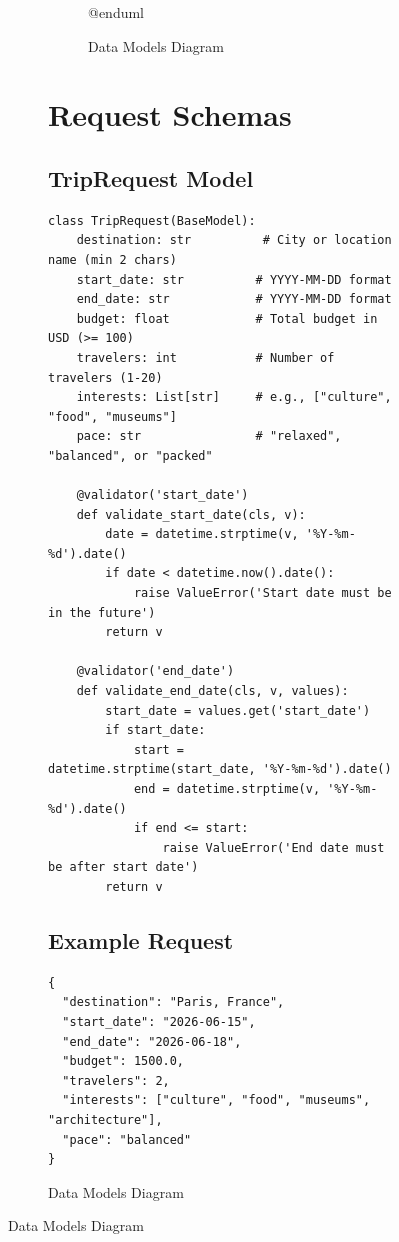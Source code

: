 \documentclass[12pt,a4paper]{report}
\begin{document}
\begin{figure}[H]
\begin{plantuml}
\begin{figure}[H]
\begin{plantuml}
\begin{figure}[H]
\begin{plantuml}
@enduml
    \end{plantuml}
    \caption{Data Models Diagram}
    \label{fig:data-models}
\end{figure}

\section{Request Schemas}

\subsection{TripRequest Model}

\begin{lstlisting}[style=pythonstyle, caption={TripRequest Pydantic Model}]
class TripRequest(BaseModel):
    destination: str          # City or location name (min 2 chars)
    start_date: str          # YYYY-MM-DD format
    end_date: str            # YYYY-MM-DD format
    budget: float            # Total budget in USD (>= 100)
    travelers: int           # Number of travelers (1-20)
    interests: List[str]     # e.g., ["culture", "food", "museums"]
    pace: str                # "relaxed", "balanced", or "packed"
    
    @validator('start_date')
    def validate_start_date(cls, v):
        date = datetime.strptime(v, '%Y-%m-%d').date()
        if date < datetime.now().date():
            raise ValueError('Start date must be in the future')
        return v
    
    @validator('end_date')
    def validate_end_date(cls, v, values):
        start_date = values.get('start_date')
        if start_date:
            start = datetime.strptime(start_date, '%Y-%m-%d').date()
            end = datetime.strptime(v, '%Y-%m-%d').date()
            if end <= start:
                raise ValueError('End date must be after start date')
        return v
\end{lstlisting}

\subsection{Example Request}

\begin{lstlisting}[style=jsonStyle, caption={Example Trip Request JSON}]
{
  "destination": "Paris, France",
  "start_date": "2026-06-15",
  "end_date": "2026-06-18",
  "budget": 1500.0,
  "travelers": 2,
  "interests": ["culture", "food", "museums", "architecture"],
  "pace": "balanced"
}
\end{lstlisting}


\end{plantuml}
\end{figure}
\end{plantuml}
\end{figure}
\end{document}
